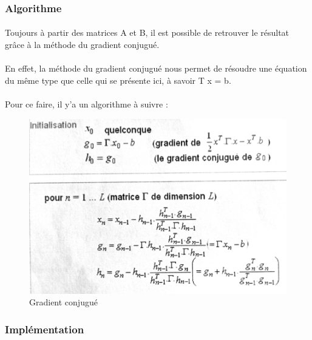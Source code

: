 \documentclass[a4paper,11pt]{article}
\begin{document}
			\subsubsection{Algorithme}

			\paragraph{}
			Toujours à partir des matrices A et B, il est possible de retrouver le résultat grâce à la méthode du gradient conjugué.

			\paragraph{}
			En effet, la méthode du gradient conjugué nous permet de résoudre une équation du même type que celle qui se présente ici, à savoir T \time x = b.


			\paragraph{}
			Pour ce faire, il y'a un algorithme à suivre :

			\begin{figure}[h]
				\centerline{\includegraphics[scale=0.50]{img/gradient_conjugue.png}}
				\caption{Gradient conjugué }
				\label{diagramme-composants}
			\end{figure}

			\subsubsection{Implémentation}
\end{document}
